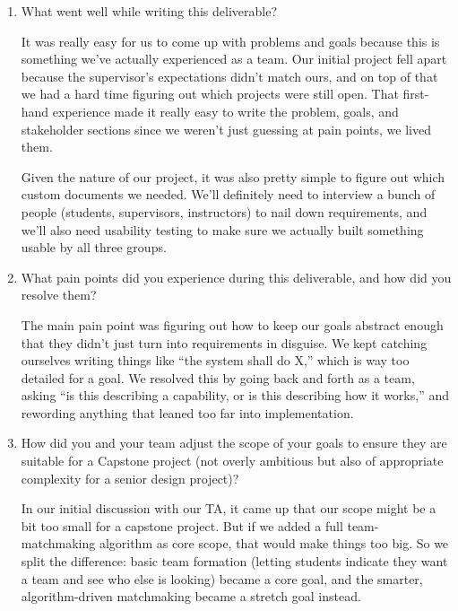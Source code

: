 \documentclass{article}
\begin{document}
\begin{enumerate}
    \item What went well while writing this deliverable?

          It was really easy for us to come up with problems and goals because
          this is something we've actually experienced as a team. Our initial
          project fell apart because the supervisor's expectations didn't match
          ours, and on top of that we had a hard time figuring out which
          projects were still open. That first-hand experience made it really
          easy to write the problem, goals, and stakeholder sections since we
          weren't just guessing at pain points, we lived them.

          Given the nature of our project, it was also pretty simple to figure
          out which custom documents we needed. We'll definitely need to
          interview a bunch of people (students, supervisors, instructors) to
          nail down requirements, and we'll also need usability testing to make
          sure we actually built something usable by all three groups.

    \item What pain points did you experience during this deliverable, and how
          did you resolve them?

          The main pain point was figuring out how to keep our goals abstract
          enough that they didn't just turn into requirements in disguise. We
          kept catching ourselves writing things like ``the system shall do X,''
          which is way too detailed for a goal. We resolved this by going back
          and forth as a team, asking ``is this describing a capability, or is
          this describing how it works,'' and rewording anything that leaned too
          far into implementation.

    \item How did you and your team adjust the scope of your goals to ensure
          they are suitable for a Capstone project (not overly ambitious but
          also of appropriate complexity for a senior design project)?

          In our initial discussion with our TA, it came up that our scope
          might be a bit too small for a capstone project. But if we added a
          full team-matchmaking algorithm as core scope, that would make things
          too big. So we split the difference: basic team formation (letting
          students indicate they want a team and see who else is looking)
          became a core goal, and the smarter, algorithm-driven matchmaking
          became a stretch goal instead.

\end{enumerate}
\end{document}
